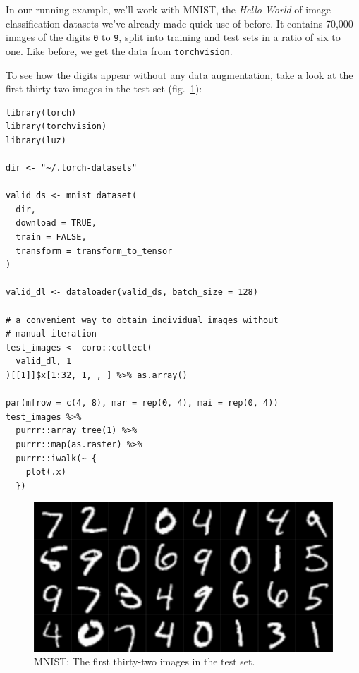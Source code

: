 \documentclass[
  letterpaper,
]{krantz}
\begin{document}
In our running example, we'll work with MNIST, the \emph{Hello World} of
image-classification datasets we've already made quick use of before. It
contains 70,000 images of the digits \texttt{0} to \texttt{9}, split
into training and test sets in a ratio of six to one. Like before, we
get the data from \texttt{torchvision}.

To see how the digits appear without any data augmentation, take a look
at the first thirty-two images in the test set
(fig.~\ref{fig-overfitting-mnist-test}):

\begin{verbatim}
library(torch)
library(torchvision)
library(luz)

dir <- "~/.torch-datasets"

valid_ds <- mnist_dataset(
  dir,
  download = TRUE,
  train = FALSE,
  transform = transform_to_tensor
)

valid_dl <- dataloader(valid_ds, batch_size = 128)

# a convenient way to obtain individual images without 
# manual iteration
test_images <- coro::collect(
  valid_dl, 1
)[[1]]$x[1:32, 1, , ] %>% as.array()

par(mfrow = c(4, 8), mar = rep(0, 4), mai = rep(0, 4))
test_images %>%
  purrr::array_tree(1) %>%
  purrr::map(as.raster) %>%
  purrr::iwalk(~ {
    plot(.x)
  })
\end{verbatim}

\begin{figure}[H]

{\centering \includegraphics{images/overfitting-mnist-test.png}

}

\caption{\label{fig-overfitting-mnist-test}MNIST: The first thirty-two
images in the test set.}

\end{figure}
\end{document}
